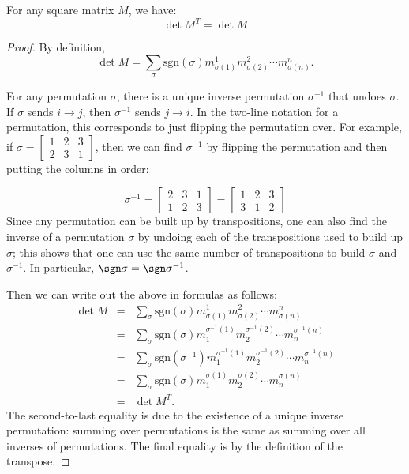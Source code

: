 \begin{theorem}
For any square matrix $M$, we have:
\[
\det M^T = \det M
\]
\end{theorem}
\begin{proof}
  By definition, \[
\det M = \sum_{\sigma} \text{sgn}(\sigma) m^1_{\sigma(1)}m^2_{\sigma(2)}\cdots m^n_{\sigma(n)}.
\]

For any permutation $\sigma$, there is a unique inverse permutation $\sigma^{-1}$ that undoes $\sigma$.  If $\sigma$ sends $i\rightarrow j$, then $\sigma^{-1}$ sends $j\rightarrow i$.  In the two-line notation for a permutation, this corresponds to just flipping the permutation over.  For example, if $\sigma=\begin{bmatrix} 
1 & 2 & 3 \\
2 & 3 & 1
\end{bmatrix}$, then we can find $\sigma^{-1}$ by flipping the permutation and then putting the columns in order:

\[
\sigma^{-1}=\begin{bmatrix} 
2 & 3 & 1 \\
1 & 2 & 3
\end{bmatrix}=\begin{bmatrix} 
1 & 2 & 3 \\
3 & 1 & 2
\end{bmatrix}
\]
Since any permutation can be built up by transpositions, one can also find the inverse of a permutation $\sigma$ by undoing each of the transpositions used to build up $\sigma$; this shows that one can use the same number of transpositions to build $\sigma$ and $\sigma^{-1}$.  In particular, $\sgn \sigma= \sgn \sigma^{-1}$.


Then we can write out the above in formulas as follows:
\begin{eqnarray*}
\det M &=& \sum_{\sigma} \text{sgn}(\sigma) m^1_{\sigma(1)}m^2_{\sigma(2)}\cdots m^n_{\sigma(n)} \\
&=& \sum_{\sigma} \text{sgn}(\sigma) m_1^{\sigma^{-1}(1)}m_2^{\sigma^{-1}(2)}\cdots m_n^{\sigma^{-1}(n)} \\
&=& \sum_{\sigma} \text{sgn}(\sigma^{-1}) m_1^{\sigma^{-1}(1)}m_2^{\sigma^{-1}(2)}\cdots m_n^{\sigma^{-1}(n)} \\
&=& \sum_{\sigma} \text{sgn}(\sigma) m_1^{\sigma(1)}m_2^{\sigma(2)}\cdots m_n^{\sigma(n)} \\
&=& \det M^T.
\end{eqnarray*}
The second-to-last equality is due to the existence of a unique inverse permutation: summing over permutations is the same as summing over all inverses of permutations.  The final equality is by the definition of the transpose.
\end{proof}

